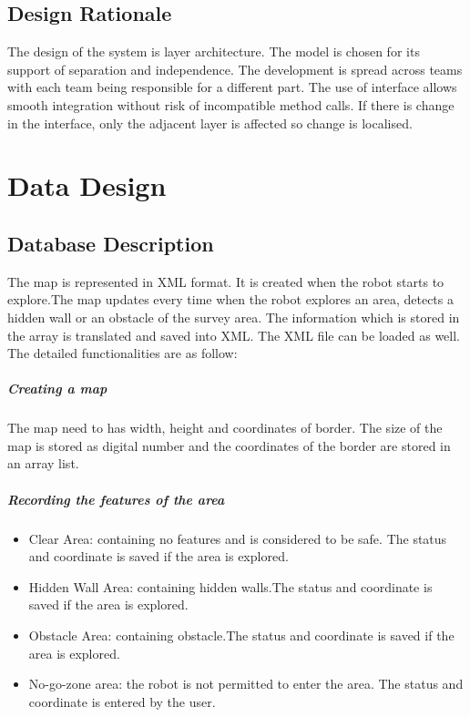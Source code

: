 \documentclass[11pt, a4paper]{report}
\begin{document}
\section{Design Rationale}
The design of the system is layer architecture. The model is chosen for its support of separation
and independence. The development is spread across teams with each team being responsible
for a different part. The use of interface allows smooth integration without risk of
 incompatible method calls. If there is change in the interface, only the adjacent layer is affected
 so change is localised.

\pagebreak


\chapter{Data Design}%
\label{cha:DD1}

\section{Database Description}
The map is represented in XML format. It is created when the robot starts to explore.The map updates every time when the robot explores an area, detects
a hidden wall or an obstacle of the survey area. The information which is stored in the array is translated
and saved into XML. The XML file can be loaded as well. The detailed functionalities are
as follow:

\paragraph{Creating a map}

The map need to has width, height and coordinates of border. The size of the map is stored as digital number and the coordinates of the border are stored in an array list.

\paragraph{Recording the features of the area}

\begin{itemize}
\item  Clear Area: containing no features and is considered to be safe. The status and coordinate is saved if the area is explored.
\item	 Hidden Wall Area: containing hidden walls.The status and coordinate is saved if the area is explored.
\item  Obstacle Area: containing obstacle.The status and coordinate is saved if the area is explored.
\item  No-go-zone area: the robot is not permitted to enter the area. The status and coordinate is entered by the user.
\end{itemize}
\end{document}
